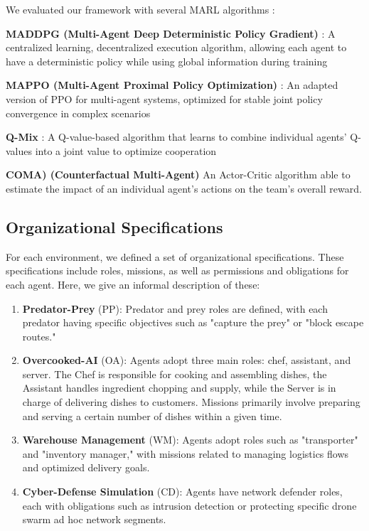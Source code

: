 \documentclass[sigconf,anonymous]{aamas}
\begin{document}
We evaluated our framework with several MARL algorithms :
%
\begin{enumerate*}[label={\roman*)}, itemjoin={; \quad}]
    \item \textbf{MADDPG (Multi-Agent Deep Deterministic Policy Gradient)} \cite{lowe2017multi}: A centralized learning, decentralized execution algorithm, allowing each agent to have a deterministic policy while using global information during training
    
    \item \textbf{MAPPO (Multi-Agent Proximal Policy Optimization)} \cite{yu2021mappo}: An adapted version of PPO for multi-agent systems, optimized for stable joint policy convergence in complex scenarios
    
    \item \textbf{Q-Mix} \cite{rashid2018qmix}: A Q-value-based algorithm that learns to combine individual agents' Q-values into a joint value to optimize cooperation
    
    \item \textbf{COMA) (Counterfactual Multi-Agent) } \cite{foerster2018counterfactual} An Actor-Critic algorithm able to estimate the impact of an individual agent's actions on the team's overall reward.

\end{enumerate*}

\subsection{Organizational Specifications}

For each environment, we defined a set of organizational specifications. These specifications include roles, missions, as well as permissions and obligations for each agent. Here, we give an informal description of these\footnotemark[1]:
%
\begin{enumerate}
    \item \textbf{Predator-Prey} (PP): Predator and prey roles are defined, with each predator having specific objectives such as "capture the prey" or "block escape routes."

    \item \textbf{Overcooked-AI} (OA): Agents adopt three main roles: chef, assistant, and server. The Chef is responsible for cooking and assembling dishes, the Assistant handles ingredient chopping and supply, while the Server is in charge of delivering dishes to customers. Missions primarily involve preparing and serving a certain number of dishes within a given time.
    
    \item \textbf{Warehouse Management} (WM): Agents adopt roles such as "transporter" and "inventory manager," with missions related to managing logistics flows and optimized delivery goals.
    
    \item \textbf{Cyber-Defense Simulation} (CD): Agents have network defender roles, each with obligations such as intrusion detection or protecting specific drone swarm ad hoc network segments.
\end{enumerate}
\end{document}
